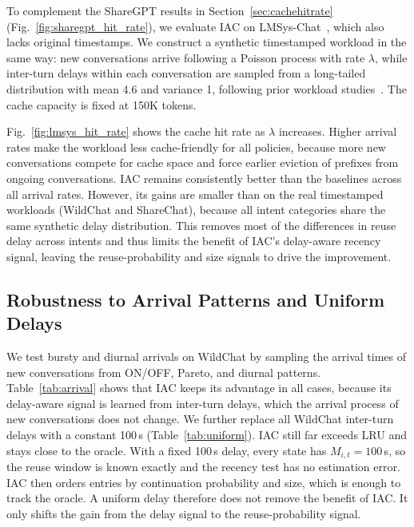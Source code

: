 \documentclass{article}
\begin{document}
To complement the ShareGPT results in Section~\ref{sec:cachehitrate} (Fig.~\ref{fig:sharegpt_hit_rate}), we evaluate IAC on LMSys-Chat~\cite{zheng2023lmsys}, which also lacks original timestamps. We construct a synthetic timestamped workload in the same way: new conversations arrive following a Poisson process with rate \(\lambda\), while inter-turn delays within each conversation are sampled from a long-tailed distribution with mean 4.6 and variance 1, following prior workload studies~\cite{servegen}. The cache capacity is fixed at 150K tokens.

Fig.~\ref{fig:lmsys_hit_rate} shows the cache hit rate as \(\lambda\) increases. Higher arrival rates make the workload less cache-friendly for all policies, because more new conversations compete for cache space and force earlier eviction of prefixes from ongoing conversations. IAC remains consistently better than the baselines across all arrival rates. However, its gains are smaller than on the real timestamped workloads (WildChat and ShareChat), because all intent categories share the same synthetic delay distribution. This removes most of the differences in reuse delay across intents and thus limits the benefit of IAC's delay-aware recency signal, leaving the reuse-probability and size signals to drive the improvement.



\subsection{Robustness to Arrival Patterns and Uniform Delays}
We test bursty and diurnal arrivals on WildChat by sampling the arrival times of new conversations from ON/OFF, Pareto, and diurnal patterns. Table~\ref{tab:arrival} shows that IAC keeps its advantage in all cases, because its delay-aware signal is learned from inter-turn delays, which the arrival process of new conversations does not change. We further replace all WildChat inter-turn delays with a constant 100\,s (Table~\ref{tab:uniform}). IAC still far exceeds LRU and stays close to the oracle. With a fixed 100\,s delay, every state has \(M_{i,t}=100\)\,s, so the reuse window is known exactly and the recency test has no estimation error. IAC then orders entries by continuation probability and size, which is enough to track the oracle. A uniform delay therefore does not remove the benefit of IAC. It only shifts the gain from the delay signal to the reuse-probability signal.
\end{document}
